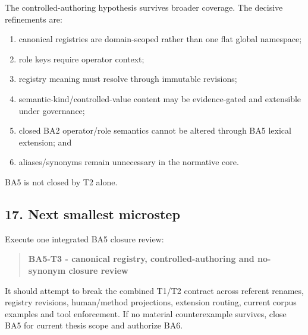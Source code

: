 \documentclass[
  10pt,
  a4paper,
]{article}
\providecommand{\tightlist}{%
  \setlength{\itemsep}{0pt}\setlength{\parskip}{0pt}}
\begin{document}
The controlled-authoring hypothesis survives broader coverage. The
decisive refinements are:

\begin{enumerate}
\def\labelenumi{\arabic{enumi}.}
\tightlist
\item
  canonical registries are domain-scoped rather than one flat global
  namespace;
\item
  role keys require operator context;
\item
  registry meaning must resolve through immutable revisions;
\item
  semantic-kind/controlled-value content may be evidence-gated and
  extensible under governance;
\item
  closed BA2 operator/role semantics cannot be altered through BA5
  lexical extension; and
\item
  aliases/synonyms remain unnecessary in the normative core.
\end{enumerate}

BA5 is not closed by T2 alone.

\subsection{17. Next smallest microstep}\label{next-smallest-microstep}

Execute one integrated BA5 closure review:

\begin{quote}
\textbf{BA5-T3 - canonical registry, controlled-authoring and no-synonym
closure review}
\end{quote}

It should attempt to break the combined T1/T2 contract across referent
renames, registry revisions, human/method projections, extension
routing, current corpus examples and tool enforcement. If no material
counterexample survives, close BA5 for current thesis scope and
authorize BA6.
\end{document}
